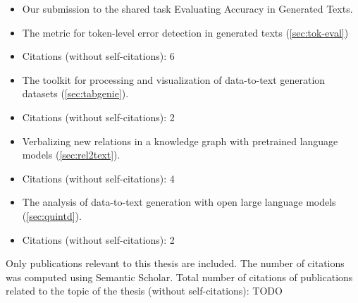 \noindent{}
\begin{itemize}[noitemsep,topsep=0pt]
    \item Our submission to the shared task Evaluating Accuracy in Generated Texts.
    \item The metric for token-level error detection in generated texts (\autoref{sec:tok-eval})
    \item Citations (without self-citations): 6

\end{itemize}\vspace{.5\baselineskip}


\noindent{}
\begin{itemize}[noitemsep,topsep=0pt]

    \item The toolkit for processing and visualization of data-to-text generation datasets (\autoref{sec:tabgenie}).
    \item Citations (without self-citations): 2

\end{itemize}\vspace{.5\baselineskip}


\noindent{}
\begin{itemize}[noitemsep,topsep=0pt]

    \item Verbalizing new relations in a knowledge graph with pretrained language models (\autoref{sec:rel2text}).
    \item Citations (without self-citations): 4

\end{itemize}\vspace{.5\baselineskip}


\noindent{}
\begin{itemize}[noitemsep,topsep=0pt]

    \item The analysis of data-to-text generation with open large language models (\autoref{sec:quintd}).
    \item Citations (without self-citations): 2

\end{itemize}\vspace{.5\baselineskip}

\vfill

\noindent Only publications relevant to this thesis are included. The number of
citations was computed using Semantic Scholar. Total number of citations of
publications related to the topic of the thesis (without self-citations):
{\large TODO} %
